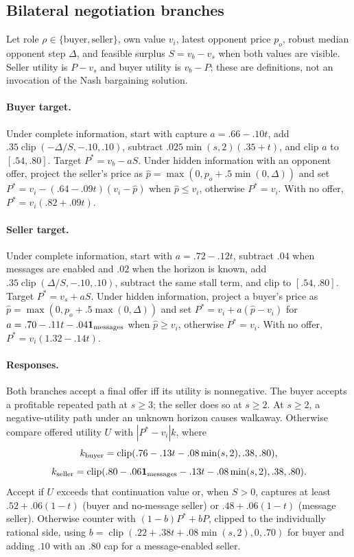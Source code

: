 \subsection{Bilateral negotiation branches}

Let role $\rho\in\{\text{buyer},\text{seller}\}$, own value $v_i$, latest
opponent price $p_o$, robust median opponent step $\Delta$, and feasible surplus
$S=v_b-v_s$ when both values are visible. Seller utility is $P-v_s$ and buyer
utility is $v_b-P$; these are definitions, not an invocation of the Nash
bargaining solution.

\paragraph{Buyer target.}
Under complete information, start with capture
$a=.66-.10t$, add $.35\operatorname{clip}(-\Delta/S,-.10,.10)$, subtract
$.025\min(s,2)(.35+t)$, and clip $a$ to $[.54,.80]$. Target
$P^*=v_b-aS$. Under hidden information with an opponent offer, project the
seller's price as $\hat p=\max(0,p_o+.5\min(0,\Delta))$ and set
$P^*=v_i-(.64-.09t)(v_i-\hat p)$ when $\hat p\le v_i$, otherwise $P^*=v_i$.
With no offer, $P^*=v_i(.82+.09t)$.

\paragraph{Seller target.}
Under complete information, start with $a=.72-.12t$, subtract $.04$ when
messages are enabled and $.02$ when the horizon is known, add
$.35\operatorname{clip}(\Delta/S,-.10,.10)$, subtract the same stall term, and
clip to $[.54,.80]$. Target $P^*=v_s+aS$. Under hidden information, project a
buyer's price as $\hat p=\max(0,p_o+.5\max(0,\Delta))$ and set
$P^*=v_i+a(\hat p-v_i)$ for $a=.70-.11t-.04\mathbf1_{\rm messages}$ when
$\hat p\ge v_i$, otherwise $P^*=v_i$. With no offer,
$P^*=v_i(1.32-.14t)$.

\paragraph{Responses.}
Both branches accept a final offer iff its utility is nonnegative. The buyer
accepts a profitable repeated path at $s\ge3$; the seller does so at $s\ge2$.
At $s\ge2$, a negative-utility path under an unknown horizon causes walkaway.
Otherwise compare offered utility $U$ with $|P^*-v_i|k$, where
\[
 k_{\rm buyer}=\operatorname{clip}(.76-.13t-.08\min(s,2),.38,.80),
\]
\[
 k_{\rm seller}=\operatorname{clip}(.80-.06\mathbf1_{\rm messages}
 -.13t-.08\min(s,2),.38,.80).
\]
Accept if $U$ exceeds that continuation value or, when $S>0$, captures at least
$.52+.06(1-t)$ (buyer and no-message seller) or $.48+.06(1-t)$ (message
seller). Otherwise counter with $(1-b)P^*+bP$, clipped to the individually
rational side, using
$b=\operatorname{clip}(.22+.38t+.08\min(s,2),0,.70)$ for buyer and adding $.10$
with an $.80$ cap for a message-enabled seller.

